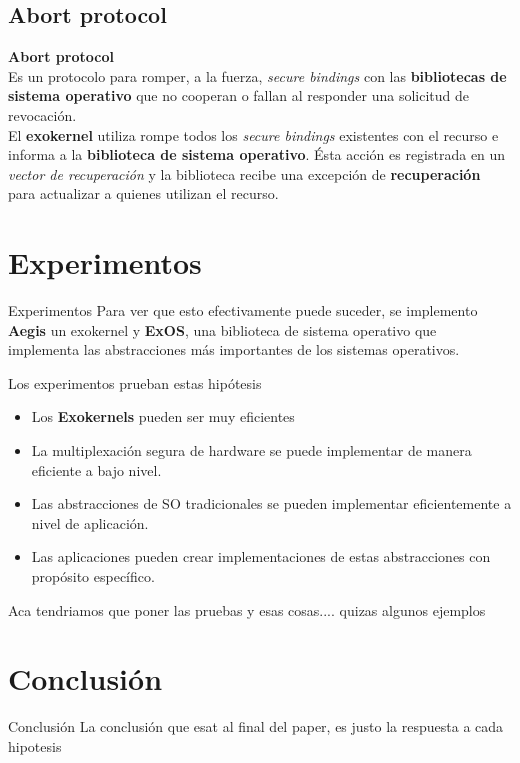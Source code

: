 \documentclass[10pt]{beamer}
\begin{document}
\subsection{Abort protocol}

\begin{frame}
\textbf{Abort protocol} \\[2em]

Es un protocolo para romper, a la fuerza, \textit{secure bindings} con las \textbf{bibliotecas de sistema operativo} que no cooperan o fallan al responder una solicitud de revocación.\\[1em]

El \textbf{exokernel} utiliza rompe todos los \textit{secure bindings} existentes con el recurso e informa a la \textbf{biblioteca de sistema operativo}. Ésta acción es registrada en un \textit{vector de recuperación} y la biblioteca recibe una excepción de \textbf{recuperación} para actualizar a quienes utilizan el recurso.
\end{frame}


\section{Experimentos}

\begin{frame}{Experimentos}
Para ver que esto efectivamente puede suceder, se implemento \textbf{Aegis} un exokernel y \textbf{ExOS}, una biblioteca de sistema operativo que implementa las abstracciones más importantes de los sistemas operativos. 

Los experimentos prueban estas hipótesis

\begin{itemize}
  \item Los \textbf{Exokernels} pueden ser muy eficientes
  \item La multiplexación segura de hardware se puede implementar de manera eficiente a bajo nivel.
  \item Las abstracciones de SO tradicionales se pueden implementar eficientemente a nivel de aplicación.
  \item Las aplicaciones pueden crear implementaciones de estas abstracciones con propósito específico.
\end{itemize}
\end{frame}

\begin{frame}
Aca tendriamos que poner las pruebas y esas cosas.... quizas algunos ejemplos 
\end{frame}

\section{Conclusión}

\begin{frame}{Conclusión}
 La conclusión que esat al final del paper, es justo la respuesta a cada hipotesis
\end{frame}



\end{document}
